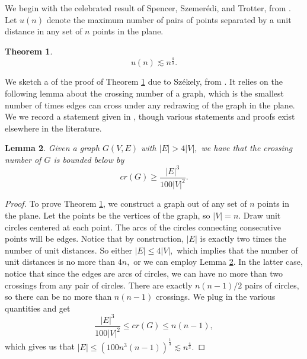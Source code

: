 \documentclass[12pt]{article}
\newtheorem{theorem}{Theorem}[section]
\newtheorem{lemma}[theorem]{Lemma}
\begin{document}
We begin with the celebrated result of Spencer, Szemer\'edi, and Trotter, from \cite{SST84}. Let $u(n)$ denote the maximum number of pairs of points separated by a unit distance in any set of $n$ points in the plane.
\begin{theorem}\label{SST}
$$u(n) \lesssim n^\frac{4}{3}.$$
\end{theorem}
We sketch a of the proof of Theorem \ref{SST} due to Sz\' ekely, from \cite{Szek}. It relies on the following lemma about the crossing number of a graph, which is the smallest number of times edges can cross under any redrawing of the graph in the plane. We we record a statement given in \cite{Szek}, though various statements and proofs exist elsewhere in the literature.
\begin{lemma}\label{crossingNumber}
Given a graph $G(V,E)$ with $|E|>4|V|,$ we have that the crossing number of $G$ is bounded below by
$$cr(G)\geq \frac{|E|^3}{100|V|^2}.$$
\end{lemma}
\begin{proof}
To prove Theorem \ref{SST}, we construct a graph out of any set of $n$ points in the plane. Let the points be the vertices of the graph, so $|V|=n.$ Draw unit circles centered at each point. The arcs of the circles connecting consecutive points will be edges. Notice that by construction, $|E|$ is exactly two times the number of unit distances. So either $|E|\leq 4|V|,$ which implies that the number of unit distances is no more than $4n,$ or we can employ Lemma \ref{crossingNumber}. In the latter case, notice that since the edges are arcs of circles, we can have no more than two crossings from any pair of circles. There are exactly $n(n-1)/2$ pairs of circles, so there can be no more than $n(n-1)$ crossings. We plug in the various quantities and get
\begin{equation}\label{crossingBound}
\frac{|E|^3}{100|V|^2}\leq cr(G)\leq n(n-1),
\end{equation}
which gives us that $|E|\leq (100n^3(n-1))^\frac{1}{3}\lesssim n^\frac{4}{3}.$
\end{proof}
\end{document}
